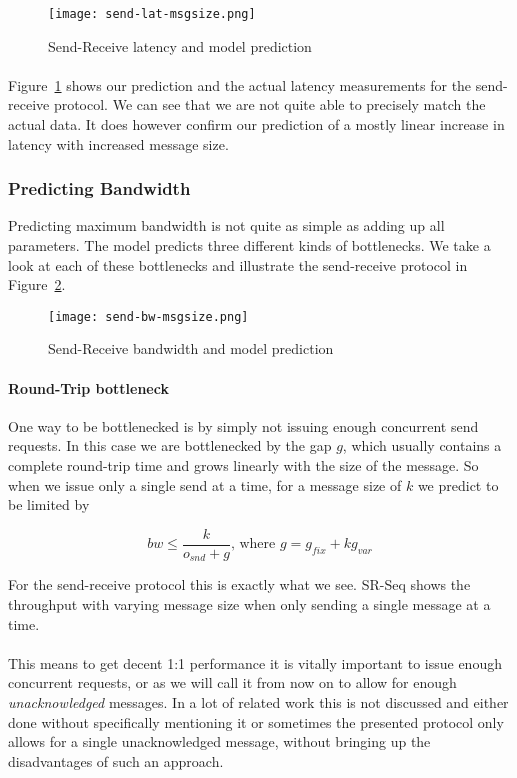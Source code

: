 \begin{figure}[ht]
  \centering
  \texttt{[image: send-lat-msgsize.png]}
  \caption{Send-Receive latency and model prediction}
    \label{fig:model-lat}
\end{figure}

\paragraph{} Figure~\ref{fig:model-lat} shows our prediction and the actual latency measurements for the send-receive protocol.
We can see that we are not quite able to precisely match the actual data. It does
however confirm our prediction of a mostly linear increase in latency with increased message size.


\subsubsection{Predicting Bandwidth}
Predicting maximum bandwidth is not quite as simple as adding up all parameters. The model predicts three different kinds of
bottlenecks. We take a look at each of these bottlenecks and illustrate the send-receive protocol in Figure~\ref{fig:model-bw}.

\begin{figure}[ht]
  \centering
  \texttt{[image: send-bw-msgsize.png]}
  \caption{Send-Receive bandwidth and model prediction}
    \label{fig:model-bw}
\end{figure}

\paragraph{Round-Trip bottleneck} One way to be bottlenecked is by simply not issuing enough concurrent send requests. In 
this case we are bottlenecked by the gap $g$, which usually contains a complete round-trip time and grows linearly with 
the size of the message. So when we issue only a single send at a time, for a message size of $k$ we predict to be limited by

$$
bw \leq \frac{k}{o_{snd} + g}\text{, where } g = g_{fix} + kg_{var} 
$$

For the send-receive protocol this is exactly what we see. SR-Seq shows the throughput with varying message size when only 
sending a single message at a time. 

\paragraph{} This means to get decent 1:1 performance it is vitally important to issue enough concurrent requests, or as we 
will call it from now on to allow for enough \emph{unacknowledged} messages. In a lot of related work this is not discussed
and either done without specifically mentioning it or sometimes the presented protocol only allows for a single unacknowledged
message, without bringing up the disadvantages of such an approach.


